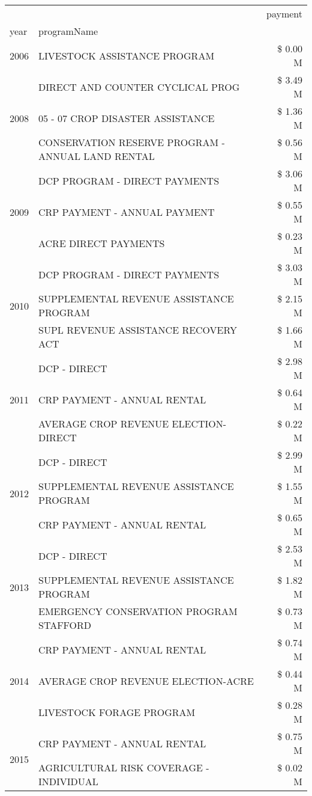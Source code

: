 \begin{tabular}{llr}
\toprule
 &  & payment \\
year & programName &  \\
\midrule
2006 & LIVESTOCK ASSISTANCE PROGRAM & \$ 0.00 M \\
\cline{1-3}
\multirow[t]{3}{*}{2008} & DIRECT AND COUNTER CYCLICAL PROG & \$ 3.49 M \\
 & 05 - 07 CROP DISASTER ASSISTANCE & \$ 1.36 M \\
 & CONSERVATION RESERVE PROGRAM - ANNUAL LAND RENTAL & \$ 0.56 M \\
\cline{1-3}
\multirow[t]{3}{*}{2009} & DCP PROGRAM - DIRECT PAYMENTS & \$ 3.06 M \\
 & CRP PAYMENT - ANNUAL PAYMENT & \$ 0.55 M \\
 & ACRE DIRECT PAYMENTS & \$ 0.23 M \\
\cline{1-3}
\multirow[t]{3}{*}{2010} & DCP PROGRAM - DIRECT PAYMENTS & \$ 3.03 M \\
 & SUPPLEMENTAL REVENUE ASSISTANCE PROGRAM & \$ 2.15 M \\
 & SUPL REVENUE ASSISTANCE RECOVERY ACT & \$ 1.66 M \\
\cline{1-3}
\multirow[t]{3}{*}{2011} & DCP - DIRECT & \$ 2.98 M \\
 & CRP PAYMENT - ANNUAL RENTAL & \$ 0.64 M \\
 & AVERAGE CROP REVENUE ELECTION-DIRECT & \$ 0.22 M \\
\cline{1-3}
\multirow[t]{3}{*}{2012} & DCP - DIRECT & \$ 2.99 M \\
 & SUPPLEMENTAL REVENUE ASSISTANCE PROGRAM & \$ 1.55 M \\
 & CRP PAYMENT - ANNUAL RENTAL & \$ 0.65 M \\
\cline{1-3}
\multirow[t]{3}{*}{2013} & DCP - DIRECT & \$ 2.53 M \\
 & SUPPLEMENTAL REVENUE ASSISTANCE PROGRAM & \$ 1.82 M \\
 & EMERGENCY CONSERVATION PROGRAM STAFFORD & \$ 0.73 M \\
\cline{1-3}
\multirow[t]{3}{*}{2014} & CRP PAYMENT - ANNUAL RENTAL & \$ 0.74 M \\
 & AVERAGE CROP REVENUE ELECTION-ACRE & \$ 0.44 M \\
 & LIVESTOCK FORAGE PROGRAM & \$ 0.28 M \\
\cline{1-3}
\multirow[t]{3}{*}{2015} & CRP PAYMENT - ANNUAL RENTAL & \$ 0.75 M \\
 & AGRICULTURAL RISK COVERAGE - INDIVIDUAL & \$ 0.02 M \\

\end{tabular}
